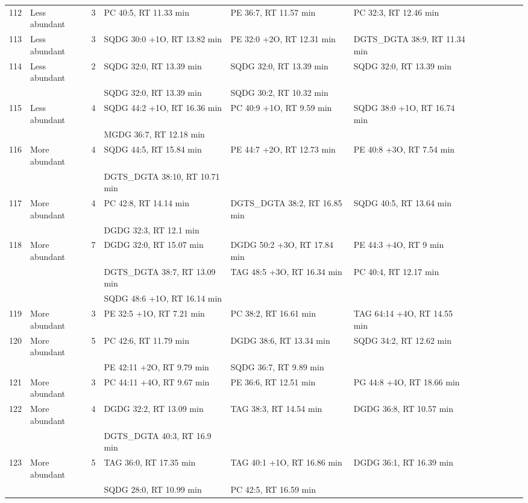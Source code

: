 \begin{landscape}
\begin{footnotesize}
\begin{singlespace}
\begin{flushleft}
\begin{longtable}{ Lp{.03\linewidth} Lp{.12\linewidth} Lp{.03\linewidth} Lp{.24\linewidth} Lp{.24\linewidth} Lp{.24\linewidth} }
112 & Less abundant & 3 & PC 40:5, RT 11.33 min & PE 36:7, RT 11.57 min & PC 32:3, RT 12.46 min \\
113 & Less abundant & 3 & SQDG 30:0 +1O, RT 13.82 min & PE 32:0 +2O, RT 12.31 min & DGTS\_DGTA 38:9, RT 11.34 min \\
114 & Less abundant & 2 & SQDG 32:0, RT 13.39 min & SQDG 32:0, RT 13.39 min & SQDG 32:0, RT 13.39 min \\
 &  &  & SQDG 32:0, RT 13.39 min & SQDG 30:2, RT 10.32 min &  \\
115 & Less abundant & 4 & SQDG 44:2 +1O, RT 16.36 min & PC 40:9 +1O, RT 9.59 min & SQDG 38:0 +1O, RT 16.74 min \\
 &  &  & MGDG 36:7, RT 12.18 min &  &  \\
116 & More abundant & 4 & SQDG 44:5, RT 15.84 min & PE 44:7 +2O, RT 12.73 min & PE 40:8 +3O, RT 7.54 min \\
 &  &  & DGTS\_DGTA 38:10, RT 10.71 min &  &  \\
117 & More abundant & 4 & PC 42:8, RT 14.14 min & DGTS\_DGTA 38:2, RT 16.85 min & SQDG 40:5, RT 13.64 min \\
 &  &  & DGDG 32:3, RT 12.1 min &  &  \\
118 & More abundant & 7 & DGDG 32:0, RT 15.07 min & DGDG 50:2 +3O, RT 17.84 min & PE 44:3 +4O, RT 9 min \\
 &  &  & DGTS\_DGTA 38:7, RT 13.09 min & TAG 48:5 +3O, RT 16.34 min & PC 40:4, RT 12.17 min \\
 &  &  & SQDG 48:6 +1O, RT 16.14 min &  &  \\
119 & More abundant & 3 & PE 32:5 +1O, RT 7.21 min & PC 38:2, RT 16.61 min & TAG 64:14 +4O, RT 14.55 min \\
120 & More abundant & 5 & PC 42:6, RT 11.79 min & DGDG 38:6, RT 13.34 min & SQDG 34:2, RT 12.62 min \\
 &  &  & PE 42:11 +2O, RT 9.79 min & SQDG 36:7, RT 9.89 min &  \\
121 & More abundant & 3 & PC 44:11 +4O, RT 9.67 min & PE 36:6, RT 12.51 min & PG 44:8 +4O, RT 18.66 min \\
122 & More abundant & 4 & DGDG 32:2, RT 13.09 min & TAG 38:3, RT 14.54 min & DGDG 36:8, RT 10.57 min \\
 &  &  & DGTS\_DGTA 40:3, RT 16.9 min &  &  \\
123 & More abundant & 5 & TAG 36:0, RT 17.35 min & TAG 40:1 +1O, RT 16.86 min & DGDG 36:1, RT 16.39 min \\
 &  &  & SQDG 28:0, RT 10.99 min & PC 42:5, RT 16.59 min &  \\

\end{longtable}
\end{flushleft}
\end{singlespace}
\end{footnotesize}
\end{landscape}
